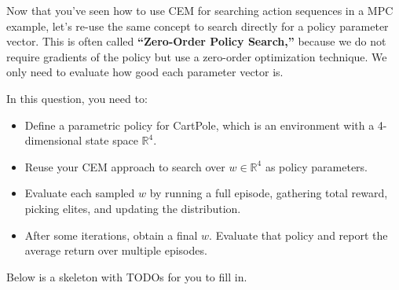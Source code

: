\documentclass{article}
\begin{document}
\noindent Now that you've seen how to use CEM for searching action sequences in a MPC example, let's re-use the same concept to search directly for a policy parameter vector. This is often called \textbf{``Zero-Order Policy Search,''} because we do not require gradients of the policy but use a zero-order optimization technique. We only need to evaluate how good each parameter vector is.

\noindent In this question, you need to:

\begin{itemize}
    \item Define a parametric policy for CartPole, which is an environment with a 4-dimensional state space $\mathbb{R}^4$. 
    \item Reuse your CEM approach to search over $w \in \mathbb{R}^4$ as policy parameters.
    \item Evaluate each sampled $w$ by running a full episode, gathering total reward, picking elites, and updating the distribution.
    \item After some iterations, obtain a final $w$. Evaluate that policy and report the average return over multiple episodes.
\end{itemize}

\noindent Below is a skeleton with TODOs for you to fill in.
\end{document}
